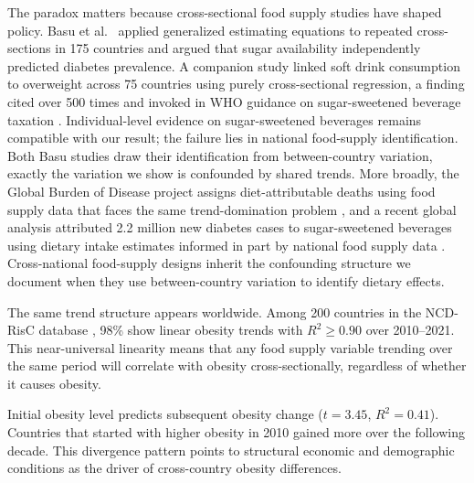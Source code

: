 The paradox matters because cross-sectional food supply studies have shaped policy. Basu et al.\ \cite{basu2013} applied generalized estimating equations to repeated cross-sections in 175 countries and argued that sugar availability independently predicted diabetes prevalence. A companion study \cite{basu2013ajph} linked soft drink consumption to overweight across 75 countries using purely cross-sectional regression, a finding cited over 500 times and invoked in WHO guidance on sugar-sweetened beverage taxation \cite{who2023ssb}. Individual-level evidence on sugar-sweetened beverages remains compatible with our result; the failure lies in national food-supply identification. Both Basu studies draw their identification from between-country variation, exactly the variation we show is confounded by shared trends. More broadly, the Global Burden of Disease project assigns diet-attributable deaths using food supply data that faces the same trend-domination problem \cite{gbd2019}, and a recent global analysis attributed 2.2 million new diabetes cases to sugar-sweetened beverages using dietary intake estimates informed in part by national food supply data \cite{laracastor2025}. Cross-national food-supply designs inherit the confounding structure we document when they use between-country variation to identify dietary effects.

The same trend structure appears worldwide. Among 200 countries in the NCD-RisC database \cite{ncdrisc2024bmi}, 98\% show linear obesity trends with $R^2 \geq 0.90$ over 2010--2021. This near-universal linearity means that any food supply variable trending over the same period will correlate with obesity cross-sectionally, regardless of whether it causes obesity.

Initial obesity level predicts subsequent obesity change ($t = 3.45$, $R^2 = 0.41$). Countries that started with higher obesity in 2010 gained more over the following decade. This divergence pattern points to structural economic and demographic conditions as the driver of cross-country obesity differences.
